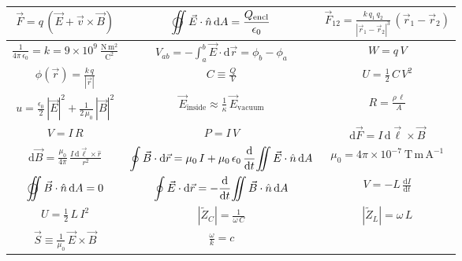 \newcommand{\vspacer}{\rule[-2.75ex]{0pt}{7ex}}%
\newcommand{\iint}{\makebox[0.5ex][l]{$\displaystyle\int$}\int}%
\newcommand{\oiint}{\makebox[-0.20ex][l]{$\bigcirc$}\iint}%
\begin{tabular}{|c|c|c|}%
\hline\vspacer
$\displaystyle \vec{F}= q\,(\vec{E}+\vec{v}\times\vec{B})$
&
$\displaystyle
  \oiint \vec{E}\cdot\hat{n}\,\mathrm{d}A= \frac{Q_\mathrm{encl}}{\epsilon_0}$
&
$\displaystyle
  \vec{F}_{12}= \frac{k\,q_1\,q_2}{|\vec{r}_1-\vec{r}_2|^3}
    \,(\vec{r}_1-\vec{r}_2)$
\\\hline\vspacer
$\displaystyle \frac{1}{4\pi\,\epsilon_0}= k=
   9\times 10^9~\mathrm{\frac{N\,m^2}{C^2}}$
&
$\displaystyle V_{ab}= -\int_a^b \vec{E}\cdot\mathrm{d}\vec{r}= \phi_b-\phi_a$
&
$\displaystyle W= q\,V$
\\\hline\vspacer
$\displaystyle \phi(\vec{r})= \frac{k\,q}{|\vec{r}|}$
&
$\displaystyle C\equiv \frac{Q}{V}$
&
$\displaystyle U= \frac{1}{2}\,C\,V^2$
\\\hline\vspacer
$\displaystyle
   u= \frac{\epsilon_0}{2}\,|\vec{E}|^2+\frac{1}{2\,\mu_0}\,|\vec{B}|^2$
&
$\displaystyle \vec{E}_\mathrm{inside}\approx\frac{1}{\kappa}\,\vec{E}_\mathrm{vacuum}$
&
$\displaystyle R= \frac{\rho\,\ell}{A}$
\\\hline\vspacer
$\displaystyle V= I\,R$
&
$\displaystyle P= I\,V$
&
$\displaystyle \mathrm{d}\vec{F}= I\,\mathrm{d}\vec{\ell}\times\vec{B}$
\\\hline\vspacer
$\displaystyle \mathrm{d}\vec{B}= \frac{\mu_0}{4\pi}\,\frac{I\,\mathrm{d}\vec{\ell}\times\hat{r}}{r^2}$
&
$\displaystyle \oint \vec{B}\cdot\mathrm{d}\vec{r}= \mu_0\,I
   +\mu_0\,\epsilon_0\,\frac{\mathrm{d}}{\mathrm{d}t}
   \iint\vec{E}\cdot\hat{n}\,\mathrm{d}A$
&
$\displaystyle \mu_0= 4\pi\times 10^{-7}~\mathrm{T\,m\,A^{-1}}$
\\\hline\vspacer
$\displaystyle
  \oiint\vec{B}\cdot\hat{n}\,\mathrm{d}A= 0$
&
$\displaystyle \oint \vec{E}\cdot\mathrm{d}\vec{r}=
   -\frac{\mathrm{d}}{\mathrm{d}t}
   \iint\vec{B}\cdot\hat{n}\,\mathrm{d}A$
&
$\displaystyle V= -L\,\frac{\mathrm{d}I}{\mathrm{d}t}$
\\\hline\vspacer
$\displaystyle U= \frac{1}{2}\,L\,I^2$
&
$\displaystyle |\tilde{Z}_C|= \frac{1}{\omega\,C}$
&
$\displaystyle |\tilde{Z}_L|= \omega\,L$
\\\hline\vspacer
$\displaystyle \vec{S}\equiv\frac{1}{\mu_0}\,\vec{E}\times\vec{B}$
&
$\displaystyle \frac{\omega}{k}=c$
&
\\\hline

\end{tabular}
